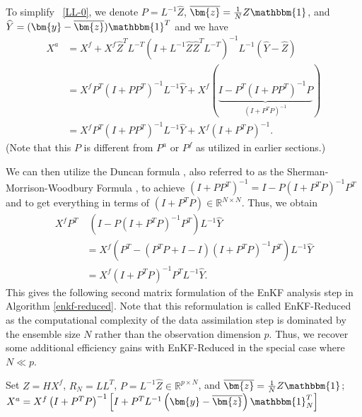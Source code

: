 \documentclass[11p]{elsarticle}
\numberwithin{equation}{section}
\begin{document}
To simplify ~\eqref{LL-0}, we denote \(P=L^{-1}\widehat{Z}\), $\overline{\bm{z}}=\frac{1}{N}Z\mathbbm{1}$, and 
$\widehat{Y}=(\bm{y}-\overline{\bm{z}})\mathbbm{1}^T$  and we have
\begin{equation}\label{LL}
\begin{aligned}
X^a &= 
X^f+ X^f\widehat{Z}^TL^{-T}\left(I+L^{-1}\widehat{Z}\widehat{Z}^TL^{-T}\right)^{-1}L^{-1}(\widehat{Y}-\widehat{Z})\\
&=X^fP^T\left(I+PP^T\right)^{-1}L^{-1}\widehat{Y}+
X^f\left(\underbrace{I - P^T\left(I+PP^T\right)^{-1}P}_{(I+P^TP)^{-1}}\right)\\
&=X^fP^T\left(I+PP^T\right)^{-1}L^{-1}\widehat{Y}+
X^f\left(I+P^TP\right)^{-1}.
\end{aligned}
\end{equation}
(Note that this $P$ is different from $P^a$ or $P^f$ as utilized in earlier sections.) 

We can then utilize the Duncan formula \cite{1944DuncanW-aa}, also referred to as the Sherman-Morrison-Woodbury Formula \cite{1950ShermanJ_MorrisonW-aa, 1950WoodburyM-aa},  to achieve \((I+PP^T)^{-1}=I-P(I+P^TP)^{-1}P^T\)
and to get everything in terms of \((I+P^TP)\in \mathbb{R}^{N\times N}\). Thus, we obtain
\begin{equation}\label{LL-2}
\begin{aligned}
X^fP^T
&\;
(I-P(I+P^TP)^{-1}P^T)L^{-1}\widehat{Y}\\
&=
X^f\left(P^T-(P^TP+I-I)(I+P^TP)^{-1}P^T\right)L^{-1}\widehat{Y}\\
&=X^f(I+P^TP)^{-1}P^T L^{-1}\widehat{Y}.
\end{aligned}
\end{equation}
This gives the following second matrix formulation of the EnKF analysis step in Algorithm \ref{enkf-reduced}.  Note that this reformulation is called EnKF-Reduced as the computational complexity of the data assimilation step is dominated by the ensemble size $N$ rather than the observation dimension $p$.  Thus, we recover some additional efficiency gains with EnKF-Reduced in the special case where $N \ll p$.

\begin{algorithm}[H]
\caption{EnKF-Reduced Analysis (Matrix Formulation 2) \label{enkf-reduced}}
\begin{algorithmic}[1]
\State Set $Z = H X^f$, $R_N=L L^T$, $P=L^{-1}\widehat{Z}\in\mathbb{R}^{p\times N}$, and 
$\overline{\bm{z}}=\frac{1}{N}Z\mathbbm{1}$; 
\State
\(
X^a = X^f\left(I+P^TP\right)^{-1}\left[I + P^TL^{-1}\left(\bm{y}-\overline{\bm{z}}\right)\mathbbm{1}_N^T
\right]
\)
\State {}
\EndFunction
\end{algorithmic}
\end{algorithm}
\end{document}
